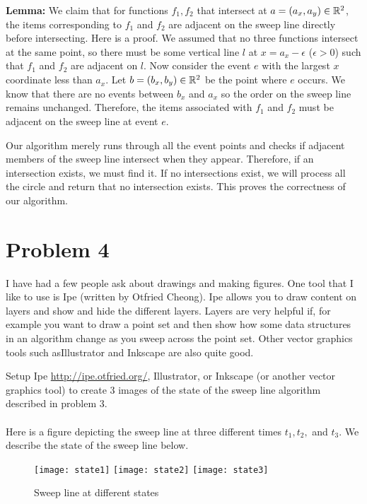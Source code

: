 \documentclass[11pt]{article}
\begin{document}
{\bf Lemma: }
We claim that for functions $f_1, f_2$ that intersect at $a = (a_x, a_y) \in \mathbb{R} ^2$, the items corresponding to $f_1$ and $f_2$ are adjacent on the sweep line directly before intersecting.
Here is a proof.
We assumed that no three functions intersect at the same point, so there must be some vertical line $l$ at $x = a_x - \epsilon$ ($\epsilon > 0$) such that $f_1$ and $f_2$ are adjacent on $l$.
Now consider the event $e$ with the largest $x$ coordinate less than $a_x$.
Let $b = (b_x, b_y) \in \mathbb{R} ^2$ be the point where $e$ occurs.
We know that there are no events between $b_x$ and $a_x$ so the order on the sweep line remains unchanged.
Therefore, the items associated with $f_1$ and $f_2$ must be adjacent on the sweep line at event $e$.

Our algorithm merely runs through all the event points and checks if adjacent members of the sweep line intersect when they appear.
Therefore, if an intersection exists, we must find it.
If no intersections exist, we will process all the circle and return that no intersection exists.
This proves the correctness of our algorithm.

\newpage
\section*{Problem 4}

I have had a few people ask about drawings and making figures.  One tool that I
like to use is Ipe (written by Otfried Cheong).  Ipe allows you to draw content
on layers and show and hide the different layers.  Layers are very helpful if,
for example you want to draw a point set and then show how some data structures
in an algorithm change as you sweep across the point set.
Other vector graphics tools such asIllustrator and Inkscape are also quite good.

Setup Ipe \url{http://ipe.otfried.org/}, Illustrator, or Inkscape
(or another vector graphics tool)
to create 3 images of the state of the sweep line algorithm
described in problem 3. \\\\
\answer
Here is a figure depicting the sweep line at three different times $t_1, t_2, $ and $t_3$.
We describe the state of the sweep line below.

\begin{figure}[h]
   \centering
   \texttt{[image: state1]} \hfill
   \texttt{[image: state2]} \hfill
   \texttt{[image: state3]}
   \caption{Sweep line at different states}
   \label{fig:swplnstate}
\end{figure}
\end{document}
